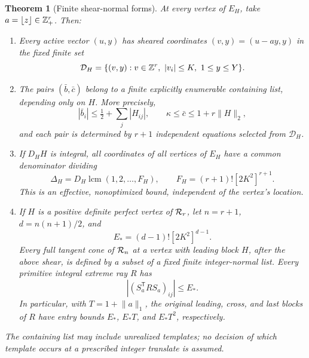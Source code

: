 \documentclass[11pt]{article}
\newtheorem{theorem}{Theorem}[section]
\theoremstyle{definition}\newtheorem{definition}[theorem]{Definition}
\theoremstyle{remark}\newtheorem{remark}[theorem]{Remark}
\newcommand{\T}{^{\mathsf T}}\newcommand{\norm}[1]{\lVert #1\rVert}
\begin{document}
\begin{theorem}[Finite shear-normal forms]\label{thm:templates}
At every vertex of $E_H$, take $a=\lfloor z\rfloor\in\mathbb Z_+^r$. Then:
\begin{enumerate}
\item Every active vector $(u,y)$ has sheared coordinates $(v,y)=(u-ay,y)$ in the fixed finite set
\[
 \mathcal D_H=\{(v,y):v\in\mathbb Z^r,\ |v_i|\le K,\ 1\le y\le Y\}.
\]
\item The pairs $(\bar b,\bar c)$ belong to a finite explicitly enumerable containing list, depending only on $H$. More precisely,
\[
 |\bar b_i|\le\tfrac12+\sum_j|H_{ij}|,\qquad
 \kappa\le\bar c\le1+r\norm H_2,
\]
and each pair is determined by $r+1$ independent equations selected from $\mathcal D_H$.
\item If $D_HH$ is integral, all coordinates of all vertices of $E_H$ have a common denominator dividing
\[
 \Delta_H=D_H\operatorname{lcm}(1,2,\ldots,F_H),\qquad
 F_H=(r+1)![2K^2]^{r+1}.
\]
This is an effective, nonoptimized bound, independent of the vertex's location.
\item If $H$ is a positive definite perfect vertex of $\mathcal R_r$, let $n=r+1$, $d=n(n+1)/2$, and
\[
 E_*=(d-1)![2K^2]^{d-1}.
\]
Every full tangent cone of $\mathcal R_n$ at a vertex with leading block $H$, after the above shear, is defined by a subset of a fixed finite integer-normal list. Every primitive integral extreme ray $R$ has
\begin{equation}\label{eq:shearedrays}
 |(S_a\T RS_a)_{ij}|\le E_*.
\end{equation}
In particular, with $T=1+\norm a_1$, the original leading, cross, and last blocks of $R$ have entry bounds $E_*$, $E_*T$, and $E_*T^2$, respectively.
\end{enumerate}
The containing list may include unrealized templates; no decision of which template occurs at a prescribed integer translate is assumed.
\end{theorem}
\end{document}
